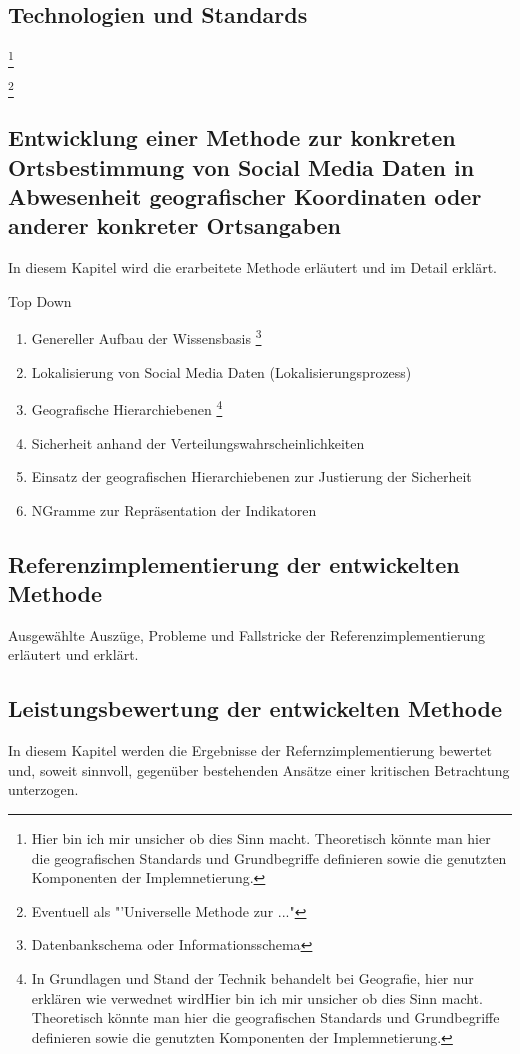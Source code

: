		\subsection{Technologien und Standards}
			\footnote{Hier bin ich mir unsicher ob dies Sinn macht. 
			Theoretisch könnte man hier die geografischen Standards und Grundbegriffe definieren sowie die genutzten Komponenten der Implemnetierung.} 

		\footnote{Eventuell als "'Universelle Methode zur ..."}
		\subsection{Entwicklung einer Methode zur konkreten Ortsbestimmung von Social Media Daten in Abwesenheit geografischer Koordinaten oder anderer konkreter Ortsangaben}
			In diesem Kapitel wird die erarbeitete Methode erläutert und im Detail erklärt. 

			Top Down
			\begin{enumerate}
				\item Genereller Aufbau der Wissensbasis \footnote{Datenbankschema oder Informationsschema} 
				\item Lokalisierung von Social Media Daten (Lokalisierungsprozess) 
				\item Geografische Hierarchiebenen \footnote{In Grundlagen und Stand der Technik behandelt bei Geografie, hier nur erklären wie verwednet wirdHier bin ich mir unsicher ob dies Sinn macht. 
			Theoretisch könnte man hier die geografischen Standards und Grundbegriffe definieren sowie die genutzten Komponenten der Implemnetierung.}
				\item Sicherheit anhand der Verteilungswahrscheinlichkeiten
				\item Einsatz der geografischen Hierarchiebenen zur Justierung der Sicherheit    
				\item NGramme zur Repräsentation der Indikatoren
			\end{enumerate}

		\subsection{Referenzimplementierung der entwickelten Methode}
			Ausgewählte Auszüge, Probleme und Fallstricke der Referenzimplementierung erläutert und erklärt. 


		\subsection{Leistungsbewertung der entwickelten Methode}
			In diesem Kapitel werden die Ergebnisse der Refernzimplementierung bewertet und, soweit sinnvoll, gegenüber bestehenden Ansätze einer kritischen Betrachtung unterzogen. 


